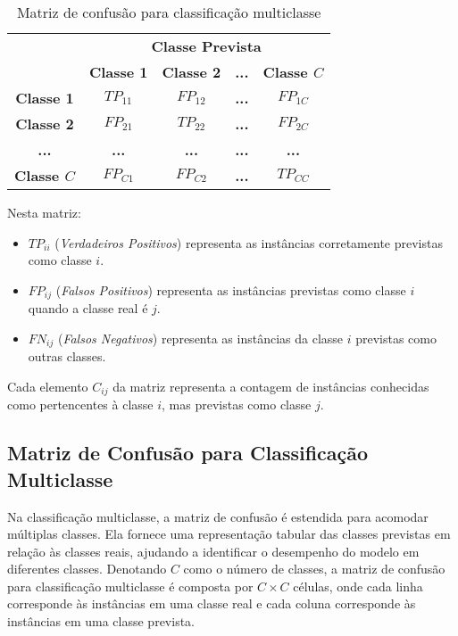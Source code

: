 \begin{table}[h]
\centering
\caption{Matriz de confusão para classificação multiclasse}
\label{tab:confusion_matrix_multiclass}
\begin{tabular}{c|c|c|c|c}
\multicolumn{1}{c}{} & \multicolumn{4}{c}{\textbf{Classe Prevista}} \\ \cline{2-5} 
\multicolumn{1}{c|}{} & \textbf{Classe 1} & \textbf{Classe 2} & \textbf{...} & \textbf{Classe \(C\)} \\ \hline
\rowcolor{gray!25} \textbf{Classe 1} & \cellcolor{green!25} \(TP_{11}\) & \(FP_{12}\) & \textbf{...} & \(FP_{1C}\) \\ \hline
\rowcolor{gray!25} \textbf{Classe 2} & \(FP_{21}\) & \cellcolor{green!25} \(TP_{22}\) & \textbf{...} & \(FP_{2C}\) \\ \hline
\rowcolor{
gray!25} \textbf{...} & \textbf{...} & \textbf{...} & \cellcolor{green!25} \textbf{...} & \textbf{...} \\ \hline
\rowcolor{gray!25} \textbf{Classe \(C\)} & \(FP_{C1}\) & \(FP_{C2}\) & \textbf{...} & \cellcolor{green!25} \(TP_{CC}\) \\ \hline
\end{tabular}
\end{table}

Nesta matriz:
\begin{itemize}
    \item \(TP_{ii}\) (\textit{Verdadeiros Positivos}) representa as instâncias corretamente previstas como classe \(i\).
    \item \(FP_{ij}\) (\textit{Falsos Positivos}) representa as instâncias previstas como classe \(i\) quando a classe real é \(j\).
    \item \(FN_{ij}\) (\textit{Falsos Negativos}) representa as instâncias da classe \(i\) previstas como outras classes.
\end{itemize}

Cada elemento \(C_{ij}\) da matriz representa a contagem de instâncias conhecidas como pertencentes à classe \(i\), mas previstas como classe \(j\).


\subsection{Matriz de Confusão para Classificação Multiclasse}

Na classificação multiclasse, a matriz de confusão é estendida para acomodar múltiplas classes. Ela fornece uma representação tabular das classes previstas em relação às classes reais, ajudando a identificar o desempenho do modelo em diferentes classes. Denotando \(C\) como o número de classes, a matriz de confusão para classificação multiclasse é composta por \(C \times C\) células, onde cada linha corresponde às instâncias em uma classe real e cada coluna corresponde às instâncias em uma classe prevista.

